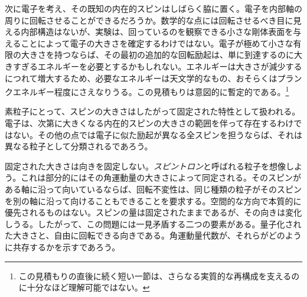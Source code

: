 次に電子を考え、その既知の内在的スピンはしばらく脇に置く。電子を内部軸の周りに回転させることができるだろうか。数学的な点には回転させるべき目に見える内部構造はないが、実験は、回っているのを観察できる小さな剛体表面を与えることによって電子の大きさを確定するわけではない。電子が極めて小さな有限の大きさを持つならば、その最初の追加的な回転励起は、単に到達するのに大きすぎるエネルギーを必要とするかもしれない。エネルギーは大きさが減少するにつれて増大するため、必要なエネルギーは天文学的なもの、おそらくはプランクエネルギー程度にさえなりうる。この見積もりは意図的に暫定的である。\footnote{この見積もりの直後に続く短い一節は、さらなる実質的な再構成を支えるのに十分なほど理解可能ではない。}

素粒子にとって、スピンの大きさはしたがって固定された特性として扱われる。電子は、次第に大きくなる内在的スピンの大きさの範囲を伴って存在するわけではない。その他の点では電子に似た励起が異なる全スピンを担うならば、それは異なる粒子として分類されるであろう。

固定された大きさは向きを固定しない。\emph{スピントロン}と呼ばれる粒子を想像しよう。これは部分的にはその角運動量の大きさによって同定される。そのスピンがある軸に沿って向いているならば、回転不変性は、同じ種類の粒子がそのスピンを別の軸に沿って向けることもできることを要求する。空間的な方向で本質的に優先されるものはない。スピンの量は固定されたままであるが、その向きは変化しうる。したがって、この問題には一見矛盾する二つの要素がある。量子化された大きさと、自由に回転できる向きである。角運動量代数が、それらがどのように共存するかを示すであろう。

\begin{classroomqa}
\end{classroomqa}

